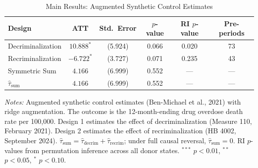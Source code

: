 \begin{table}[H]
\centering
\caption{Main Results: Augmented Synthetic Control Estimates}
\label{tab:main}
\begin{threeparttable}
\begin{tabular}{lccccc}
\toprule
Design & ATT & Std.~Error & $p$-value & RI $p$-value & Pre-periods \\
\midrule
Decriminalization & $10.888^{*}$ & (5.924) & 0.066 & 0.020 & 73 \\
Recriminalization & $-6.722^{*}$ & (3.727) & 0.071 & 0.235 & 43 \\
Symmetric Sum & $4.166$ & (6.999) & 0.552 & --- & --- \\
\midrule
$\hat{\tau}_{\text{sum}}$ & $4.166$ & (6.999) & 0.552 & --- & --- \\
\bottomrule
\end{tabular}
\begin{tablenotes}[flushleft]
\small
\item \textit{Notes:} Augmented synthetic control estimates (Ben-Michael et al., 2021) with ridge augmentation. The outcome is the 12-month-ending drug overdose death rate per 100,000. Design 1 estimates the effect of decriminalization (Measure 110, February 2021). Design 2 estimates the effect of recriminalization (HB 4002, September 2024). $\hat{\tau}_{\text{sum}} = \hat{\tau}_{\text{decrim}} + \hat{\tau}_{\text{recrim}}$; under full causal reversal, $\hat{\tau}_{\text{sum}} = 0$. RI $p$-values from permutation inference across all donor states. $^{***}$ $p<0.01$, $^{**}$ $p<0.05$, $^{*}$ $p<0.10$.
\end{tablenotes}
\end{threeparttable}
\end{table}
